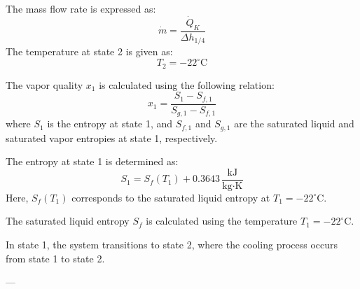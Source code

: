 The mass flow rate is expressed as:  
\[
\dot{m} = \frac{\dot{Q}_K}{\Delta h_{1/4}}
\]  
The temperature at state 2 is given as:  
\[
T_2 = -22^\circ\text{C}
\]  

The vapor quality \( x_1 \) is calculated using the following relation:  
\[
x_1 = \frac{S_1 - S_{f,1}}{S_{g,1} - S_{f,1}}
\]  
where \( S_1 \) is the entropy at state 1, and \( S_{f,1} \) and \( S_{g,1} \) are the saturated liquid and saturated vapor entropies at state 1, respectively.  

The entropy at state 1 is determined as:  
\[
S_1 = S_f(T_1) + 0.3643 \, \frac{\text{kJ}}{\text{kg·K}}
\]  
Here, \( S_f(T_1) \) corresponds to the saturated liquid entropy at \( T_1 = -22^\circ\text{C} \).  

The saturated liquid entropy \( S_f \) is calculated using the temperature \( T_1 = -22^\circ\text{C} \).  

In state 1, the system transitions to state 2, where the cooling process occurs from state 1 to state 2.  

---